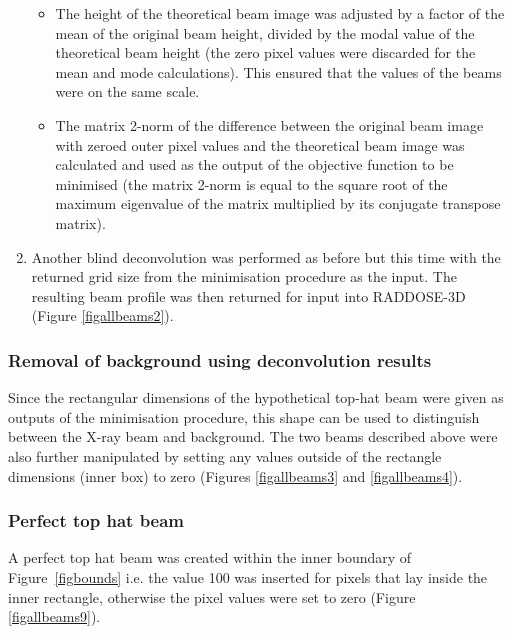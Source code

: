 \begin{enumerate}
\begin{itemize}
\item The height of the theoretical beam image was adjusted by a factor of the mean of the original beam height, divided by the modal value of the theoretical beam height (the zero pixel values were discarded for the mean and mode calculations).
This ensured that the values of the beams were on the same scale.
\item The matrix 2-norm of the difference between the original beam image with zeroed outer pixel values and the theoretical beam image was calculated and used as the output of the objective function to be minimised (the matrix 2-norm is equal to the square root of the maximum eigenvalue of the matrix multiplied by its conjugate transpose matrix).
\end{itemize}
\item Another blind deconvolution was performed as before but this time with the returned grid size from the minimisation procedure as the input.
The resulting beam profile was then returned for input into RADDOSE-3D (Figure \ref{figallbeams2}).
\end{enumerate}

\subsubsection{Removal of background using deconvolution results}
Since the rectangular dimensions of the hypothetical top-hat beam were given as outputs of the minimisation procedure, this shape can be used to distinguish between the X-ray beam and background.
The two beams described above were also further manipulated by setting any values outside of the rectangle dimensions (inner box) to zero (Figures \ref{figallbeams3} and \ref{figallbeams4}).

\subsubsection{Perfect top hat beam}
A perfect top hat beam was created within the inner boundary of Figure~\ref{figbounds}  i.e. the value 100 was inserted for pixels that lay inside the inner rectangle, otherwise the pixel values were set to zero (Figure \ref{figallbeams9}).

